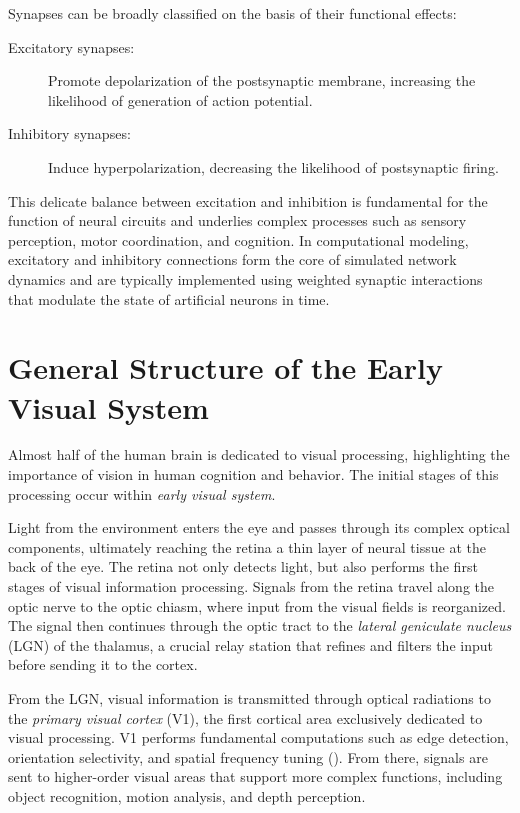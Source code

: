Synapses can be broadly classified on the basis of their functional effects:

\begin{description}
    \item[Excitatory synapses:] Promote depolarization of the postsynaptic membrane, increasing the likelihood of generation of action potential.
    \item[Inhibitory synapses:] Induce hyperpolarization, decreasing the likelihood of postsynaptic firing.
\end{description}

This delicate balance between excitation and inhibition is fundamental for the function of neural circuits and underlies complex processes such as sensory perception, motor coordination, and cognition. In computational modeling, excitatory and inhibitory connections form the core of simulated network dynamics and are typically implemented using weighted synaptic interactions that modulate the state of artificial neurons in time.

\section{General Structure of the Early Visual System}
\label{sec:general_structure}

Almost half of the human brain is dedicated to visual processing, highlighting the importance of vision in human cognition and behavior. The initial stages of this processing occur within \emph{early visual system}.

Light from the environment enters the eye and passes through its complex optical components, ultimately reaching the retina a thin layer of neural tissue at the back of the eye. The retina not only detects light, but also performs the first stages of visual information processing. Signals from the retina travel along the optic nerve to the optic chiasm, where input from the visual fields is reorganized. The signal then continues through the optic tract to the \emph{lateral geniculate nucleus} (LGN) of the thalamus, a crucial relay station that refines and filters the input before sending it to the cortex.

From the LGN, visual information is transmitted through optical radiations to the \emph{primary visual cortex} (V1), the first cortical area exclusively dedicated to visual processing. V1 performs fundamental computations such as edge detection, orientation selectivity, and spatial frequency tuning (\citet{bear2020neuroscience}). From there, signals are sent to higher-order visual areas that support more complex functions, including object recognition, motion analysis, and depth perception.

